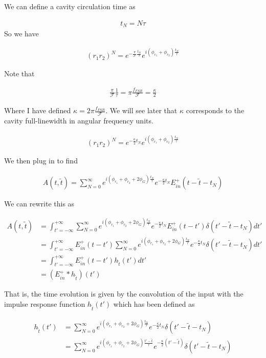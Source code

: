 \documentclass[12pt]{article}
\begin{document}
We can define a cavity circulation time as 

\begin{align}
t_N = N\tau
\end{align}
So we have

\begin{align}
(r_1r_2)^N = e^{-\frac{\pi}{\mathcal{F}} \frac{t_N}{\tau}}e^{i(\phi_{r_1}+\phi_{r_2})\frac{t_N}{\tau}}
\end{align}

Note that

\begin{align}
\frac{\pi}{\mathcal{F}}\frac{1}{\tau} = \pi \frac{f_{FSR}}{\mathcal{F}} = \frac{\kappa}{2}
\end{align}

Where I have defined $\kappa = 2\pi \frac{f_{FSR}}{\mathcal{F}}$. We will see later that $\kappa$ corresponds to the cavity full-linewidth in angular frequency units.

\begin{align}
(r_1r_2)^N = e^{-\frac{\kappa}{2} t_N}e^{i(\phi_{r_1}+\phi_{r_2})\frac{t_N}{\tau}}
\end{align}

We then plug in to find

\begin{align}
A(t,\tilde{t}) = \sum_{N=0}^{\infty} e^{i(\phi_{r_1} + \phi_{r_2}+2\phi_G) \frac{t_N}{\tau}}e^{-\frac{\kappa}{2}t_N}E_{in}^+(t-\tilde{t} - t_N)
\end{align}

We can rewrite this as

\begin{align}
A(t,\tilde{t}) &= \int_{t'=-\infty}^{+\infty} \sum_{N=0}^{\infty} e^{i(\phi_{r_1} + \phi_{r_2}+2\phi_G) \frac{t_N}{\tau}}e^{-\frac{\kappa}{2}t_N}E_{in}^+(t-t') \delta(t'-\tilde{t}-t_N)dt'\\
&= \int_{t'=-\infty}^{+\infty} E_{in}^+(t-t') \sum_{N=0}^{\infty} e^{i(\phi_{r_1} + \phi_{r_2}+2\phi_G) \frac{t_N}{\tau}}e^{-\frac{\kappa}{2}t_N} \delta(t'-\tilde{t}-t_N)dt'\\
&= \int_{t'=-\infty}^{+\infty} E_{in}^+(t-t') h_{\tilde{t}}(t') dt'\\
&= (E_{in}^+ \ast h_{\tilde{t}})(t')
\end{align}

That is, the time evolution is given by the convolution of the input with the impulse response function $h_{\tilde{t}}(t')$ which has been defined as

\begin{align}
h_{\tilde{t}}(t') &= \sum_{N=0}^{\infty} e^{i(\phi_{r_1}+\phi_{r_2} + 2\phi_G) \frac{t_N}{\tau}}e^{-\frac{\kappa}{2}t_N}\delta(t'-\tilde{t}-t_N)\\
&=\sum_{N=0}^{\infty} e^{i(\phi_{r_1}+\phi_{r_2} + 2\phi_G) \frac{t'-\tilde{t}}{\tau}}e^{-\frac{\kappa}{2}(t'-\tilde{t})}\delta(t'-\tilde{t}-t_N)\\
\end{align}
\end{document}
